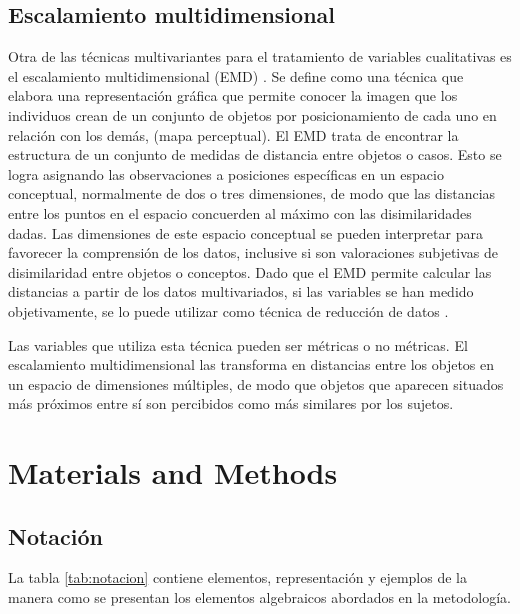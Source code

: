 \documentclass[water,article,submit,moreauthors,pdftex]{mdpi}
\begin{document}
\hypertarget{escalamiento-multidimensional}{%
\subsection{Escalamiento
multidimensional}\label{escalamiento-multidimensional}}

Otra de las técnicas multivariantes para el tratamiento de variables
cualitativas es el escalamiento multidimensional (EMD)
\citep{torgerson1952, shepard1962}. Se define como una técnica que
elabora una representación gráfica que permite conocer la imagen que los
individuos crean de un conjunto de objetos por posicionamiento de cada
uno en relación con los demás, (mapa perceptual). El EMD trata de
encontrar la estructura de un conjunto de medidas de distancia entre
objetos o casos. Esto se logra asignando las observaciones a posiciones
específicas en un espacio conceptual, normalmente de dos o tres
dimensiones, de modo que las distancias entre los puntos en el espacio
concuerden al máximo con las disimilaridades dadas. Las dimensiones de
este espacio conceptual se pueden interpretar para favorecer la
comprensión de los datos, inclusive si son valoraciones subjetivas de
disimilaridad entre objetos o conceptos. Dado que el EMD permite
calcular las distancias a partir de los datos multivariados, si las
variables se han medido objetivamente, se lo puede utilizar como técnica
de reducción de datos \citep{perez2004}.

Las variables que utiliza esta técnica pueden ser métricas o no
métricas. El escalamiento multidimensional las transforma en distancias
entre los objetos en un espacio de dimensiones múltiples, de modo que
objetos que aparecen situados más próximos entre sí son percibidos como
más similares por los sujetos.

\hypertarget{materials-and-methods}{%
\section{Materials and Methods}\label{materials-and-methods}}

\hypertarget{notaciuxf3n}{%
\subsection{Notación}\label{notaciuxf3n}}

La tabla \ref{tab:notacion} contiene elementos, representación y
ejemplos de la manera como se presentan los elementos algebraicos
abordados en la metodología.
\end{document}
